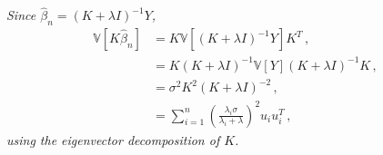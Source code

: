 \documentclass[a4paper,10pt,fleqn]{article}
\newcommand{\V}{\ensuremath{\mathbb{V}}}
\newcommand{\1}{\ensuremath{\mathbbm{1}}}
\begin{document}
\begin{enumerate}
\vspace{.2cm}

{\em
Since $\widehat{\beta}_n = (K + \lambda I)^{-1}Y$, 
		\begin{align*}
			\V [K \widehat{\beta}_n] & = K \V \left[ (K + \lambda I)^{-1} Y \right]K^T\,,\\
			& = K (K + \lambda I)^{-1} \V [Y] (K + \lambda I)^{-1} K\,,\\
			& = \sigma^2 K^2 (K + \lambda I)^{-2}\,,\\
			& = \sum_{i=1}^n \left( \frac{\lambda_i \sigma }{\lambda_i + \lambda}\right)^2 u_i u_i^T\,,
		\end{align*}
	using the eigenvector decomposition of $K$.
}
\end{enumerate}
\end{document}
